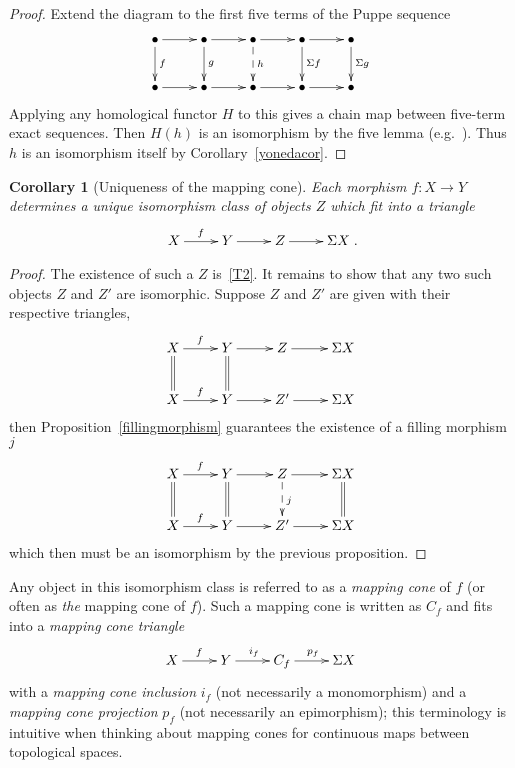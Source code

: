 \documentclass{amsproc}
\newtheorem{cor}[prop]{Corollary}
\theoremstyle{definition}
\begin{document}
\begin{proof}
Extend the diagram to the first five terms of the Puppe sequence
\begin{displaymath}
\xymatrix{{\bullet}\ar[r]\ar[d]^f & {\bullet}\ar[r]\ar[d]^g & {\bullet}\ar[r]\ar@{-->}[d]^h & {\bullet}\ar[d]^{\Sigma f}\ar[r] & {\bullet}\ar[d]^{\Sigma g}\\
{\bullet}\ar[r] & {\bullet}\ar[r] & {\bullet}\ar[r] & {\bullet}\ar[r] & {\bullet}}
\end{displaymath}
Applying any homological functor $H$ to this gives a chain map between five-term exact sequences. Then $H(h)$ is an isomorphism by the five lemma (e.g.~\cite[VIII.4.4]{Mac}). Thus $h$ is an isomorphism itself by Corollary~\ref{yonedacor}.
\end{proof}

\begin{cor}[Uniqueness of the mapping cone]
Each morphism $f:X{\longrightarrow} Y$ determines a unique isomorphism class of objects $Z$ which fit into a triangle
\begin{displaymath}
\xymatrix{X\ar[r]^f & Y\ar[r] & Z\ar[r] & {}\Sigma X}.
\end{displaymath}
\end{cor}

\begin{proof}
The existence of such a $Z$ is~\ref{T2}. It remains to show that any two such objects $Z$ and $Z'$ are isomorphic. Suppose $Z$ and $Z'$ are given with their respective triangles,
\begin{displaymath}
\xymatrix{X\ar[r]^f\ar@{=}[d] & Y\ar[r]\ar@{=}[d] & Z\ar[r] & {}\Sigma X\\
X\ar[r]^f & Y\ar[r] & Z'\ar[r] & {}\Sigma X}
\end{displaymath}
then Proposition~\ref{fillingmorphism} guarantees the existence of a filling morphism $j$
\begin{displaymath}
\xymatrix{X\ar[r]^f\ar@{=}[d] & Y\ar[r]\ar@{=}[d] & Z\ar[r]\ar@{-->}[d]^j & {}\Sigma X\ar@{=}[d]\\
X\ar[r]^f & Y\ar[r] & Z'\ar[r] & {}\Sigma X}
\end{displaymath}
which then must be an isomorphism by the previous proposition.
\end{proof}

Any object in this isomorphism class is referred to as a \emph{mapping cone} of $f$ (or often as \emph{the} mapping cone of $f$). Such a mapping cone is written as $C_f$ and fits into a \emph{mapping cone triangle}
\begin{displaymath}
\xymatrix{X\ar[r]^f & Y\ar[r]^{i_f} & C_f\ar[r]^{p_f} & {}\Sigma X}
\end{displaymath}
with a \emph{mapping cone inclusion} $i_f$ (not necessarily a monomorphism) and a \emph{mapping cone projection} $p_f$ (not necessarily an epimorphism); this terminology is intuitive when thinking about mapping cones for continuous maps between topological spaces.
\end{document}
